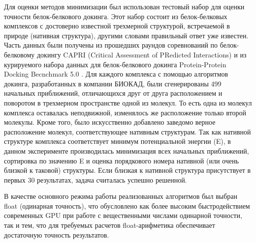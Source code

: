   Для оценки методов минимизации был использован тестовый набор для оценки точности белок-белкового докинга. Этот набор состоит из белок-белковых комплексов с достоверно известной трехмерной структурой, встречаемой в природе (нативная структура), другими словами правильный ответ уже известен. Часть данных были получены из прошедших раундов соревнований по белок-белковому докингу CAPRI (Critical Assessment of PRedicted Interactions) \cite{janin2002welcome} и из курируемого набора данных для белок-белкового докинга Protein-Protein Docking Becnchmark 5.0 \cite{vreven2015updates}. Для каждого комплекса с помощью алгоритмов докинга, разработанных в компании БИОКАД, были сгенерированы 499 начальных приближений, отличающихся друг от друга расположением и поворотом в трехмерном пространстве одной из молекул. То есть одна из молекул комплекса оставалась неподвижной, изменялось же расположение только второй молекулы. Кроме того, было искусственно добавлено заведомо верное расположение молекул, соответствующее нативным структурам. Так как нативной структуре комплекса соответствует минимум потенциальной энергии (E), в данном эксперименте производилась минимизация всех начальных приближений, сортировка по значению E и оценка порядкового номера нативной (или очень близкой к таковой) структуры. Если близкая к нативной структура присутствует в первых 30 результатах, задача считалась успешно решенной.

  В качестве основного режима работы реализованных алгоритмов был выбран float (одинарная точность), что обусловлено как более высоким быстродействием современных GPU при работе с вещественными числами одинарной точности, так и тем, что для требуемых расчетов float-арифметика обеспечивает достаточную точность результатов.

